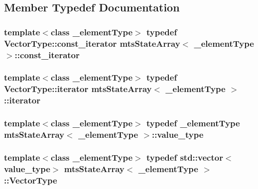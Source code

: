 \subsection{Member Typedef Documentation}
\hypertarget{classmts_state_array_a40a7371d5f45f10e9cd9308cccef0168}{
\subsubsection[{const\-\_\-iterator}]{\setlength{\rightskip}{0pt plus 5cm}template$<$class \-\_\-element\-Type$>$ typedef Vector\-Type\-::const\-\_\-iterator {\bf mts\-State\-Array}$<$ \-\_\-element\-Type $>$\-::{\bf const\-\_\-iterator}}}\label{classmts_state_array_a40a7371d5f45f10e9cd9308cccef0168}
\hypertarget{classmts_state_array_ab2a822354bffa12e2d954b4a11847e98}{
\subsubsection[{iterator}]{\setlength{\rightskip}{0pt plus 5cm}template$<$class \-\_\-element\-Type$>$ typedef Vector\-Type\-::iterator {\bf mts\-State\-Array}$<$ \-\_\-element\-Type $>$\-::{\bf iterator}}}\label{classmts_state_array_ab2a822354bffa12e2d954b4a11847e98}
\hypertarget{classmts_state_array_a1d78f1e353af8687797d4a359b694ee1}{
\subsubsection[{value\-\_\-type}]{\setlength{\rightskip}{0pt plus 5cm}template$<$class \-\_\-element\-Type$>$ typedef \-\_\-element\-Type {\bf mts\-State\-Array}$<$ \-\_\-element\-Type $>$\-::{\bf value\-\_\-type}}}\label{classmts_state_array_a1d78f1e353af8687797d4a359b694ee1}
\hypertarget{classmts_state_array_a4d8a41652bc6d14fb99d28c71286058a}{
\subsubsection[{Vector\-Type}]{\setlength{\rightskip}{0pt plus 5cm}template$<$class \-\_\-element\-Type$>$ typedef std\-::vector$<${\bf value\-\_\-type}$>$ {\bf mts\-State\-Array}$<$ \-\_\-element\-Type $>$\-::{\bf Vector\-Type}}}\label{classmts_state_array_a4d8a41652bc6d14fb99d28c71286058a}


